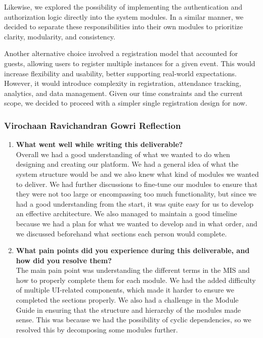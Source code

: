 \documentclass[12pt, titlepage]{article}
\begin{document}
\begin{enumerate}
  Likewise, we explored the possibility of implementing the authentication and authorization logic directly into the system modules. In a similar manner, we decided to separate these responsibilities into their own modules to prioritize clarity, modularity, and consistency.

  Another alternative choice involved a registration model that accounted for guests, allowing users to register multiple instances for a given event. This would increase flexibility and usability, better supporting real-world expectations. However, it would introduce complexity in registration, attendance tracking, analytics, and data management. Given our time constraints and the current scope, we decided to proceed with a simpler single registration design for now.

\end{enumerate}
\subsubsection*{Virochaan Ravichandran Gowri Reflection}
\begin{enumerate}
 \item \textbf{What went well while writing this deliverable?} \\
 Overall we had a good understanding of what we wanted to do when designing and creating our platform. We had a general idea of what the system structure would be and we also knew what kind of modules we wanted to deliver. We had further discussions to fine-tune our modules to ensure that they were not too large or encompassing too much functionality, but since we had a good understanding from the start, it was quite easy for us to develop an effective architecture. We also managed to maintain a good timeline because we had a plan for what we wanted to develop and in what order, and we discussed beforehand what sections each person would complete.
  
 \item \textbf{What pain points did you experience during this deliverable, and how did you resolve them?} \\
 The main pain point was understanding the different terms in the MIS and how to properly complete them for each module. We had the added difficulty of multiple UI-related components, which made it harder to ensure we completed the sections properly. We also had a challenge in the Module Guide in ensuring that the structure and hierarchy of the modules made sense. This was because we had the possibility of cyclic dependencies, so we resolved this by decomposing some modules further.
\end {enumerate}
\end{document}
